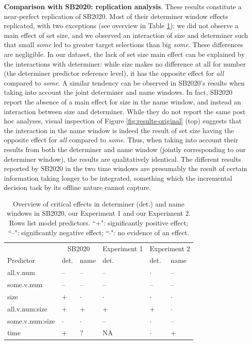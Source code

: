 \documentclass[10pt,letterpaper]{article}
\newcommand{\tableref}[1]{Table \ref{#1}}
\newcommand{\figref}[1]{Figure \ref{#1}}
\newcommand{\expref}[1]{Experiment #1}
\newcommand{\jd}[1]{\textcolor{Red}{\textbf{[jd: #1]}}}
\begin{document}
\textbf{Comparison with SB2020: replication analysis}. These results constitute a near-perfect replication of  SB2020. Most of their determiner window effects replicated, with two exceptions (see overview in \tableref{tab:replication}): we did not observe a main effect of set size, and we observed an interaction of size and determiner such that small \emph{some} led to greater target selections than big \emph{some}. These differences are negligible. In our dataset, the lack of set size main effect can be explained by the interactions with determiner: while size makes no difference at all for number (the determiner predictor reference level), it has the opposite effect for \emph{all} compared to \emph{some}. A similar tendency can be observed in SB2020's results when taking into account the joint determiner and name windows. In fact,  SB2020 report the absence of a main effect for size in the name window, and instead an interaction between size and determiner. While they do not report the same post hoc analyses, visual inspection of \figref{fig:results-original} (top) suggests that the interaction in the name window is indeed the result of set size having the opposite effect for \emph{all} compared to \emph{some}. Thus, when taking into account their results from both the determiner and name window (jointly corresponding to our determiner window), the results are qualitatively identical. The different results reported by  SB2020 in the two time windows are presumably the result of certain information taking longer to be integrated, something which the incremental decision task by its offline nature cannot capture. %

\begin{table}
\centering
\caption{Overview of critical effects in determiner (det.) and name windows in SB2020, our \expref{1} and our \expref{2}. Rows list model predictors. ``+": significantly positive effect; ``--": significantly negative effect; ``$\cdot$": no evidence of an effect.}
{\small
\begin{tabular}{l l l l l l }
\toprule
& \multicolumn{2}{c}{SB2020} & \expref{1} & \multicolumn{2}{c}{\expref{2}}\\
Predictor & det. & name & det. & det. & name \\
\midrule
all.v.num & -- &  -- &  -- & $\cdot$ & -- \\
some.v.num & -- &  -- &  -- & -- & -- \\
size & + &  $\cdot$ & $\cdot$ & $\cdot$ & $\cdot$ \\
all.v.num:size & + &  + & + & + & $\cdot$ \\
some.v.num:size & $\cdot$ &  $\cdot$ & -- & $\cdot$ & -- \\
time & + &  ? & NA & $\cdot$ & + \\
\bottomrule
\end{tabular}
}
\label{tab:replication}
\end{table}
\end{document}
